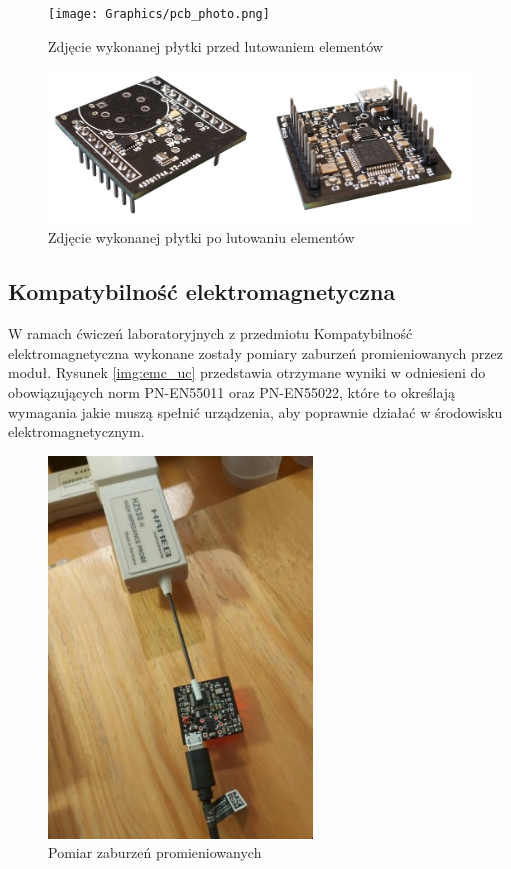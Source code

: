 \begin{figure}[H]
    \centering
    \texttt{[image: Graphics/pcb\_photo.png]}
    \caption{Zdjęcie wykonanej płytki przed lutowaniem elementów}
    \label{img:pcb_photo}
\end{figure}

\begin{figure}[H]
    \centering
    \includegraphics[width=\textwidth, height=\textheight, keepaspectratio]{Graphics/pcb_rdy_photo.png}
    \caption{Zdjęcie wykonanej płytki po lutowaniu elementów}
    \label{img:pcb_rdy_photo}
\end{figure}

\subsection{Kompatybilność elektromagnetyczna}
W ramach ćwiczeń laboratoryjnych z przedmiotu Kompatybilność elektromagnetyczna wykonane zostały pomiary zaburzeń promieniowanych przez moduł. 
Rysunek \ref{img:emc_uc} przedstawia otrzymane wyniki w odniesieni do obowiązujących norm PN-EN55011 oraz PN-EN55022, które to określają
wymagania jakie muszą spełnić urządzenia, aby poprawnie działać w środowisku elektromagnetycznym. 

\begin{figure}[H]
    \centering
    \includegraphics[width=7cm]{Graphics/emc_hz530.jpg}
    \caption{Pomiar zaburzeń promieniowanych}
    \label{img:emc_hz530}
\end{figure}

